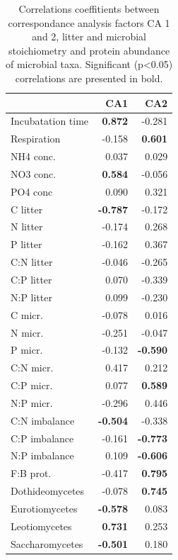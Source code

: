 \documentclass[10pt]{article}
\begin{document}
\begin{flushleft}


\begin{table}[h!]
\centering
\caption{Correlations coeffitients between correspondance analysis factors CA 1 and 2, litter and microbial stoichiometry and protein abundance of microbial taxa. Significant (p\textless 0.05) correlations are presented in bold.} 
\label{catab}
{\small
\begin{tabular}{lrr}
  \hline
 & CA1 & CA2 \\ 
  \hline
Incubatation time & \textbf{ 0.872 } & -0.281 \\ 
  Respiration & -0.158 & \textbf{ 0.601 } \\ 
  NH4 conc. & 0.037 & 0.029 \\ 
  NO3 conc. & \textbf{ 0.584 } & -0.056 \\ 
  PO4 conc & 0.090 & 0.321 \\ 
  C litter & \textbf{ -0.787 } & -0.172 \\ 
  N litter & -0.174 & 0.268 \\ 
  P litter & -0.162 & 0.367 \\ 
  C:N litter & -0.046 & -0.265 \\ 
  C:P litter & 0.070 & -0.339 \\ 
  N:P litter & 0.099 & -0.230 \\ 
  C micr. & -0.078 & 0.016 \\ 
  N micr. & -0.251 & -0.047 \\ 
  P micr. & -0.132 & \textbf{ -0.590 } \\ 
  C:N micr. & 0.417 & 0.212 \\ 
  C:P micr. & 0.077 & \textbf{ 0.589 } \\ 
  N:P micr. & -0.296 & 0.446 \\ 
  C:N imbalance & \textbf{ -0.504 } & -0.338 \\ 
  C:P imbalance & -0.161 & \textbf{ -0.773 } \\ 
  N:P imbalance & 0.109 & \textbf{ -0.606 } \\ 
  F:B prot. & -0.417 & \textbf{ 0.795 } \\ 
  Dothideomycetes & -0.078 & \textbf{ 0.745 } \\ 
  Eurotiomycetes & \textbf{ -0.578 } & 0.083 \\ 
  Leotiomycetes & \textbf{ 0.731 } & 0.253 \\ 
  Saccharomycetes & \textbf{ -0.501 } & 0.180 \\ 

\end{tabular}}
\end{table}
\end{flushleft}
\end{document}
